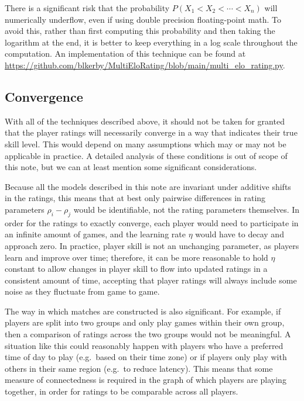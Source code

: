 \documentclass{article}
\begin{document}
	There is a significant risk that the probability $P(X_1 < X_2 < \cdots < X_n)$ will numerically underflow, even if using double precision floating-point math.
	To avoid this, rather than first computing this probability and then taking the logarithm at the end, it is better to keep everything in a log scale throughout the computation. An implementation of this technique can be found at \url{https://github.com/blkerby/MultiEloRating/blob/main/multi_elo_rating.py}.
	
	\subsection{Convergence}
	\label{sec:convergence}
	With all of the techniques described above, it should not be taken for granted that the player ratings will necessarily converge in a way that indicates their true skill level. This would depend on many assumptions which may or may not be applicable in practice. A detailed analysis of these conditions is out of scope of this note, but we can at least mention some significant considerations.
	
	Because all the models described in this note are invariant under additive shifts in the ratings, this means that at best only pairwise differences in rating parameters $\rho_i - \rho_j$ would be identifiable, not the rating parameters themselves. In order for the ratings to exactly converge, each player would need to participate in an infinite amount of games, and the learning rate $\eta$ would have to decay and approach zero. In practice, player skill is not an unchanging parameter, as players learn and improve over time; therefore, it can be more reasonable to hold $\eta$ constant to allow changes in player skill to flow into updated ratings in a consistent amount of time, accepting that player ratings will always include some noise as they fluctuate from game to game.
	
	The way in which matches are constructed is also significant. For example, if players are split into two groups and only play games within their own group, then a comparison of ratings across the two groups would not be meaningful. A situation like this could reasonably happen with players who have a preferred time of day to play (e.g.\ based on their time zone) or if players only play with others in their same region (e.g.\ to reduce latency). This means that some measure of connectedness is required in the graph of which players are playing together, in order for ratings to be comparable across all players.
	
\end{document}
